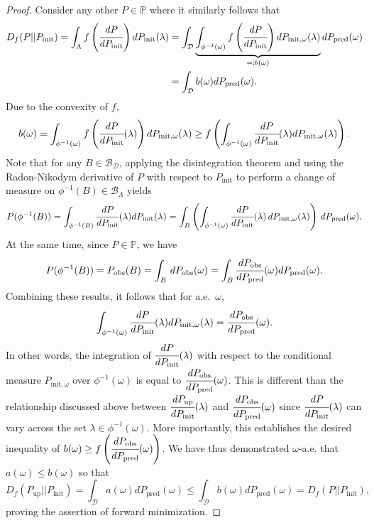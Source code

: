 \documentclass[10pt,a4paper]{amsart}
\newcommand{\B}{\mathcal{B}}
\newcommand{\initmeasomega}{P_{\text{init}, \omega}}
\newcommand{\initmeas}{P_{\text{init}}}
\newcommand{\obsmeas}{P_{\text{obs}}}
\newcommand{\predictmeas}{P_\text{pred}}
\newcommand{\p}{\mathbb{P}}
\newcommand{\updatemeas}{P_{\text{up}}}
\begin{document}
\begin{proof}
Consider any other $P\in\p$ where it similarly follows that
\begin{align}\label{eq:Bint}
  D_{f}(P || \initmeas) =  \int_{\Lambda} f\left(\cfrac{dP}{d\initmeas}\right) d\initmeas(\lambda) &= \int_{\mathcal{D}} \underbrace{\int_{\phi^{-1}(\omega)} f\left(\cfrac{dP}{d\initmeas}\right) d\initmeasomega(\lambda)}_{=: b(\omega)} d\predictmeas(\omega) \\
  &= \int_{\mathcal{D}} b(\omega) d\predictmeas(\omega). \nonumber 
\end{align}
Due to the convexity of $f$,
\begin{equation*}
    b(\omega) = \int_{\phi^{-1}(\omega)} f\left(\cfrac{dP}{d\initmeas}(\lambda)\right) d\initmeasomega(\lambda) \ge f\left(\int_{\phi^{-1}(\omega)} \cfrac{dP}{d\initmeas}(\lambda) d\initmeasomega(\lambda)\right).
\end{equation*}
Note that for any $B \in \mathcal{B}_{\mathcal{D}}$, applying the disintegration theorem and using the Radon-Nikodym derivative of $P$ with respect to $P_\text{init}$ to perform a change of measure on $\phi^{-1}(B)\in\B_\Lambda$ yields
\begin{equation*}
    P(\phi^{-1}(B)) = \int_{\phi^{-1}(B)} \cfrac{dP}{d\initmeas}(\lambda) d\initmeas(\lambda) = \int_{B} \left( \int_{\phi^{-1}(\omega)} \cfrac{dP}{d\initmeas}(\lambda) \, d\initmeasomega(\lambda) \right) \, d\predictmeas(\omega).
\end{equation*}
At the same time, since $P\in\p$, we have
\begin{equation*}
    P(\phi^{-1}(B)) = \obsmeas(B) = \int_B \, d\obsmeas(\omega) = \int_{B} \cfrac{d\obsmeas}{d\predictmeas}(\omega) d\predictmeas(\omega).
\end{equation*}
Combining these results, it follows that for a.e.~$\omega$, 
\begin{equation*}
    \int_{\phi^{-1}(\omega)} \cfrac{dP}{d\initmeas}(\lambda) d\initmeasomega(\lambda) = \cfrac{d\obsmeas}{d\predictmeas}(\omega).
\end{equation*}
In other words, the integration of $\cfrac{dP}{dP_\text{init}}(\lambda)$ with respect to the conditional measure $\initmeasomega$ over $\phi^{-1}(\omega)$ is equal to $\cfrac{d\obsmeas}{d\predictmeas}(\omega)$.
This is different than the relationship discussed above between $\cfrac{d\updatemeas}{dP_\text{init}}(\lambda)$ and $\cfrac{d\obsmeas}{d\predictmeas}(\omega)$ since $\cfrac{dP}{dP_\text{init}}(\lambda)$ can vary across the set $\lambda\in\phi^{-1}(\omega)$.  
More importantly, this establishes the desired inequality of $b(\omega) \geq f\left(\cfrac{d\obsmeas}{d\predictmeas}(\omega)\right)$.
We have thus demonstrated $\omega$-a.e. that $a(\omega) \le b(\omega)$ so  that
\begin{equation*}
 D_{f}(\updatemeas || \initmeas) = \int_{\mathcal{D}} a(\omega) d\predictmeas(\omega)  \le \int_{\mathcal{D}} b(\omega) d\predictmeas(\omega) = D_{f}(P || \initmeas) ,
\end{equation*}
proving the assertion of forward minimization. 


\end{proof}
\end{document}
